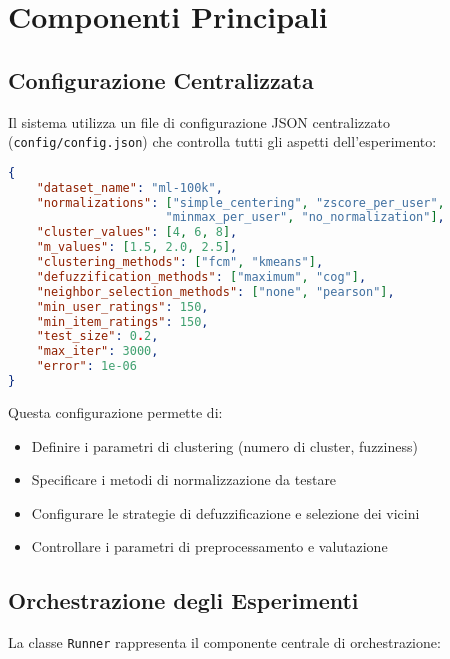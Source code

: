\section{Componenti Principali}

\subsection{Configurazione Centralizzata}

Il sistema utilizza un file di configurazione JSON centralizzato (\texttt{config/config.json}) che controlla tutti gli aspetti dell'esperimento:

\begin{lstlisting}[language=json, caption=Esempio di configurazione]
{
    "dataset_name": "ml-100k",
    "normalizations": ["simple_centering", "zscore_per_user", 
                      "minmax_per_user", "no_normalization"],
    "cluster_values": [4, 6, 8],
    "m_values": [1.5, 2.0, 2.5],
    "clustering_methods": ["fcm", "kmeans"],
    "defuzzification_methods": ["maximum", "cog"],
    "neighbor_selection_methods": ["none", "pearson"],
    "min_user_ratings": 150,
    "min_item_ratings": 150,
    "test_size": 0.2,
    "max_iter": 3000,
    "error": 1e-06
}
\end{lstlisting}

Questa configurazione permette di:
\begin{itemize}
    \item Definire i parametri di clustering (numero di cluster, fuzziness)
    \item Specificare i metodi di normalizzazione da testare
    \item Configurare le strategie di defuzzificazione e selezione dei vicini
    \item Controllare i parametri di preprocessamento e valutazione
\end{itemize}

\subsection{Orchestrazione degli Esperimenti}

La classe \texttt{Runner} rappresenta il componente centrale di orchestrazione:

